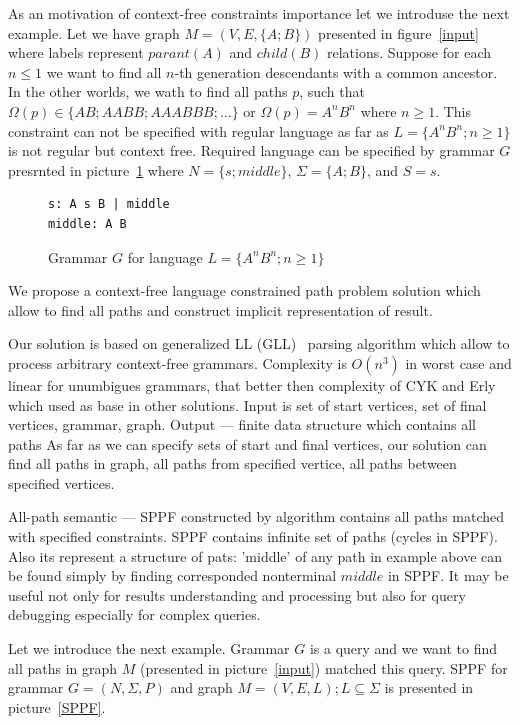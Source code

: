 \documentclass{sig-alternate} %
\begin{document}
As an motivation of context-free constraints importance let we introduse the next example.
Let we have graph $M=(V,E,\{A;B\})$ presented in figure~\ref{input} where labels represent $parant (A)$ and $child (B)$ relations. 
Suppose for each $n \leq 1$ we want to find all $n$-th generation descendants with a common ancestor.
In the other worlds, we wath to find all paths $p$, such that $\Omega(p) \in \{AB; AABB; AAABBB; \dots\}$ or $\Omega(p) = A^n B^n$ where $n \geq 1$.
This constraint can not be specified with regular language as far as $L=\{A^n B^n; n \geq 1\}$ is not regular but context free.
Required language can be specified by grammar $G$ presrnted in picture~\ref{grammarG} where $N = \{s; middle\}$, $\Sigma = \{A; B\}$, and $S = s$.

\begin{figure}[h]
   \begin{center}
\begin{verbatim}
s: A s B | middle
middle: A B
\end{verbatim}
   \caption{Grammar $G$ for language $L=\{A^n B^n; n \geq 1\}$}
   \label{grammarG}        
   \end{center}
\end{figure}

We propose a context-free language constrained path problem solution which allow to find all paths and construct implicit representation of result. 

Our solution is based on generalized LL (GLL)~\cite{GLL} parsing algorithm which allow to process arbitrary context-free grammars.
Complexity is $O(n^3)$ in worst case and linear for unumbigues grammars, that better then complexity of CYK and Erly which used as base in other solutions.
Input is set of start vertices, set of final vertices, grammar, graph. Output --- finite data structure which contains all paths
As far as we can specify sets of start and final vertices, our solution can find all paths in graph, all paths from specified vertice, all paths between specified vertices.  

All-path semantic --- SPPF constructed by algorithm contains all paths matched with specified constraints. SPPF contains infinite set of paths (cycles in SPPF). Also its represent a structure of pats: 'middle' of any path in example above can be found 
simply by finding corresponded nonterminal $middle$ in SPPF. It may be useful not only for results understanding and processing but also for query debugging especially for complex queries. 

Let we introduce the next example. Grammar $G$ is a query and we want to find all paths in graph $M$ (presented in picture~\ref{input}) matched this query. SPPF for grammar $G = (N, \Sigma ,P)$ and graph $M = (V,E,L); L \subseteq \Sigma$ 
is presented in picture~\ref{SPPF}. 
\end{document}
